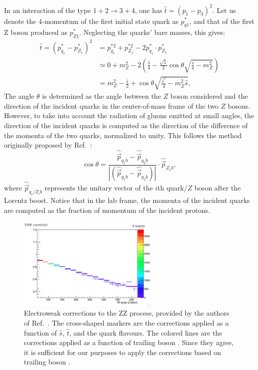 In an interaction of the type $1+2 \rightarrow 3 + 4$, 
one has $\hat{t} = \left( p_1 - p_3 \right)^2$. 
Let us denote the 4-momentum of the first initial state quark as $p^*_{q1}$,
and that of the first Z boson produced as $p^*_{Z1}$.
Neglecting the quarks' bare masses, this gives:
\begin{equation}
\begin{split}
\hat{t} = \left(p^*_{q_1}-p^*_{Z_1}\right)^2 & = p_{q_1}^{*2} +
p_{Z_1}^{*2} - 2 p^*_{q_1} \cdot p^*_{Z_1} \\
& \simeq 0 + m_{Z}^{2} - 2 \left( \frac{\hat{s}}{4} -
\frac{\sqrt{\hat{s}}}{2} \cos{\theta} \sqrt{\frac{\hat{s}}{4} -
m_{Z}^{2}} \right) \\
& = m_{Z}^{2} - \frac{\hat{s}}{2} + \cos{\theta}
\sqrt{\frac{\hat{s}^2}{4} - m_{Z}^{2}\hat{s}},
\end{split}
\end{equation}
The angle $\theta$ is determined as the angle between the $Z$ boson considered
and the direction of the incident quarks in the center-of-mass frame of the two $Z$ bosons.
However, to take into account the radiation of gluons emitted at small angles, 
the direction of the incident quarks is computed as the direction of the difference of the momenta of the two quarks, normalized to
unity. This follows the method originally proposed by Ref.~\cite{Gieseke:2014gka}:
\begin{equation}
\cos{\theta} = \frac{\hat{\vec{p}}_{q_1b} -
\hat{\vec{p}}_{q_2b}}{\left|\left( \hat{\vec{p}}_{q_1b} -
\hat{\vec{p}}_{q_2b} \right)\right|} \cdot \hat{\vec{p}}_{Z_1b},
\end{equation}
where $\hat{\vec{p}}_{q_i/Z_ib}$ represents the unitary vector of the
$i$th quark/$Z$ boson after the Lorentz boost. Notice that in the
lab frame, the momenta of the incident quarks are computed as the
fraction of momentum of the incident protons.

\begin{figure}[!thbp]
\centering
\includegraphics[width=0.60\textwidth]{figures/ZZ_ewkCorr.png}
\caption{Electroweak corrections to the ZZ process, provided by the authors of Ref.~\cite{Bierweiler:2013dja}.
The cross-shaped markers are the corrections applied as a function of $\hat{s}$, $\hat{t}$, and the quark flavours.
The colored lines are the corrections applied as a function of trailing boson \pt.
Since they agree, it is sufficient for our purposes to apply the corrections based on trailing boson \pt.}
\label{fig:ewkCorrectionCompare}
\end{figure}

